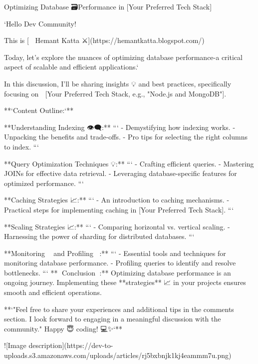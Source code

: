 Optimizing Database 🗃️Performance in [Your Preferred Tech Stack]

`Hello Dev Community! 👋 

This is [❤️‍🔥 Hemant Katta ⚔️](https://hemantkatta.blogspot.com/)

Today, let's explore the nuances of optimizing database performance-a critical aspect of scalable and efficient applications.`

In this discussion, I'll be sharing insights 💡 and best practices, specifically focusing on 🎯 [Your Preferred Tech Stack, e.g., "Node.js and MongoDB"].

**`Content Outline:`**

**Understanding Indexing 👁️‍🗨️:**
```
   - Demystifying how indexing works.
   - Unpacking the benefits and trade-offs.
   - Pro tips for selecting the right columns to index.
```

**Query Optimization Techniques 💡:**
```
   - Crafting efficient queries.
   - Mastering JOINs for effective data retrieval.
   - Leveraging database-specific features for optimized performance.
```

**Caching Strategies 📈:**
```
   - An introduction to caching mechanisms.
   - Practical steps for implementing caching in [Your Preferred Tech Stack].
```

**Scaling Strategies 📈:**
```
   - Comparing horizontal vs. vertical scaling.
   - Harnessing the power of sharding for distributed databases.
```

**Monitoring 👨‍💻 and Profiling 👨‍💼:**
```
   - Essential tools and techniques for monitoring database performance.
   - Profiling queries to identify and resolve bottlenecks.
```
**📜 Conclusion 📜:**
Optimizing database performance is an ongoing journey. Implementing these **strategies** 📈 in your projects ensures smooth and efficient operations.

**`"Feel free to share your experiences and additional tips in the comments section. I look forward to engaging in a meaningful discussion with the community." Happy 😇 coding! 💻✨`**



![Image description](https://dev-to-uploads.s3.amazonaws.com/uploads/articles/rj5bxbnjk1kj4eammm7u.png)